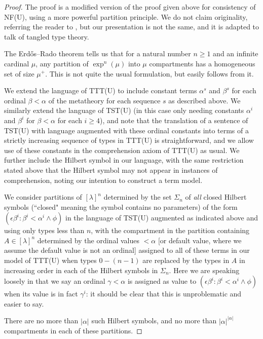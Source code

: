 \documentclass{article}
\theoremstyle{definition}
\theoremstyle{remark}
\begin{document}
\begin{proof}

The proof is a modified version of the proof given above for consistency of NF(U), using a more powerful partition principle.  We do not claim originality, referring the reader to \cite{nfu}, but our presentation is not the same, and it is adapted to talk of tangled type theory.

The Erd\H{o}s--Rado theorem tells us that for a natural number $n\geq 1$ and an infinite cardinal $\mu$, any partition of $\exp^n(\mu)$ into $\mu$ compartments
has a homogeneous set of size $\mu^+$.  This is not quite the usual formulation, but easily follows from it.

We extend the language of TTT(U) to include constant terms $\alpha^s$ and $\beta^s$ for each ordinal $\beta < \alpha$ of the metatheory for each sequence $s$ as described above.   We similarly extend the language of TST(U) (in this case only needing constants $\alpha^i$ and $\beta^i$ for $\beta<\alpha$ for each $i\geq4$),  and note that the translation of a sentence of TST(U) with language augmented with these ordinal constants into terms of a strictly increasing sequence of types in TTT(U) is straightforward, and we allow use of these constants in the comprehension axiom of TTT(U) as usual.  We further include the Hilbert symbol in our language, with the same restriction stated above that the Hilbert symbol may not appear in instances of comprehension, noting our intention to construct a term model.  

We consider partitions of $[\lambda]^n$  determined by  the set $\Sigma_n$ of {\em all\/} closed Hilbert symbols (``closed" meaning the symbol contains no parameters) of the form $(\epsilon \beta^i:\beta^i < \alpha^i \wedge \phi)$
in the language of TST(U) augmented  as indicated above and using only types less than $n$, with the compartment in the partition containing $A \in [\lambda]^n$ determined by the ordinal values $<\alpha$ [or default value, where we assume the default value is not an ordinal] assigned to all of these terms in our model of TTT(U) when types $0-(n-1)$ are replaced by the types in $A$ in increasing order in each of the Hilbert symbols in $\Sigma_n$.  Here we are speaking loosely in that we say an ordinal $\gamma<\alpha$ is assigned as value to $(\epsilon \beta^i:\beta^i < \alpha^i \wedge \phi)$ when its value is in fact $\gamma^i$:  it should be clear that this is unproblematic and easier to say.

There are no more than $|\alpha|$ such Hilbert symbols, and no more than $|\alpha|^{|\alpha|}$ compartments in each of these partitions.


\end{proof}
\end{document}
